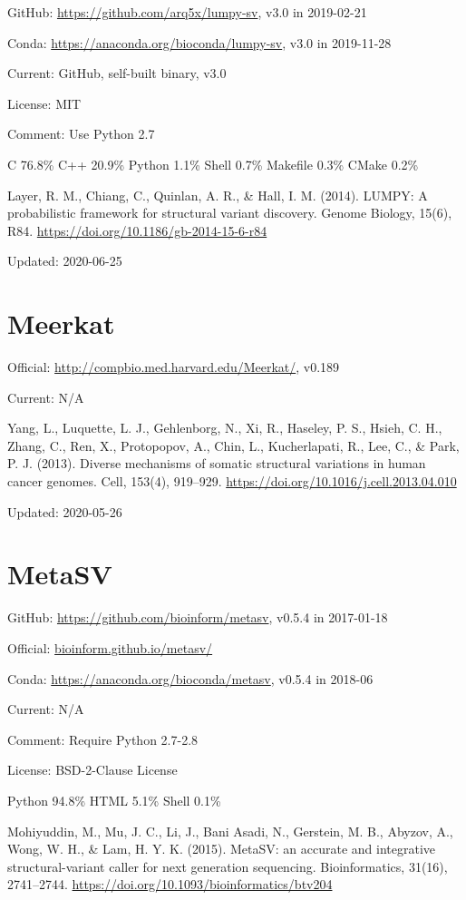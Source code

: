 \documentclass[]{article}
\begin{document}
GitHub: \url{https://github.com/arq5x/lumpy-sv}, v3.0 in 2019-02-21

Conda: \url{https://anaconda.org/bioconda/lumpy-sv}, v3.0 in 2019-11-28

Current: GitHub, self-built binary, v3.0

License: MIT

Comment: Use Python 2.7

C 76.8\% C++ 20.9\% Python 1.1\% Shell 0.7\% Makefile 0.3\% CMake 0.2\%

Layer, R. M., Chiang, C., Quinlan, A. R., \& Hall, I. M. (2014). LUMPY: A probabilistic framework for structural variant discovery. Genome Biology, 15(6), R84. \url{https://doi.org/10.1186/gb-2014-15-6-r84}

Updated: 2020-06-25

\section{Meerkat}

Official: \url{http://compbio.med.harvard.edu/Meerkat/}, v0.189

Current: N/A

Yang, L., Luquette, L. J., Gehlenborg, N., Xi, R., Haseley, P. S., Hsieh, C. H., Zhang, C., Ren, X., Protopopov, A., Chin, L., Kucherlapati, R., Lee, C., \& Park, P. J. (2013). Diverse mechanisms of somatic structural variations in human cancer genomes. Cell, 153(4), 919–929. \url{https://doi.org/10.1016/j.cell.2013.04.010}

Updated: 2020-05-26

\section{MetaSV}

GitHub: \url{https://github.com/bioinform/metasv}, v0.5.4 in 2017-01-18

Official: \url{bioinform.github.io/metasv/}

Conda: \url{https://anaconda.org/bioconda/metasv}, v0.5.4 in 2018-06

Current: N/A

Comment: Require Python 2.7-2.8

License: BSD-2-Clause License

Python 94.8\% HTML 5.1\% Shell 0.1\%

Mohiyuddin, M., Mu, J. C., Li, J., Bani Asadi, N., Gerstein, M. B., Abyzov, A., Wong, W. H., \& Lam, H. Y. K. (2015). MetaSV: an accurate and integrative structural-variant caller for next generation sequencing. Bioinformatics, 31(16), 2741–2744. \url{https://doi.org/10.1093/bioinformatics/btv204}
\end{document}
